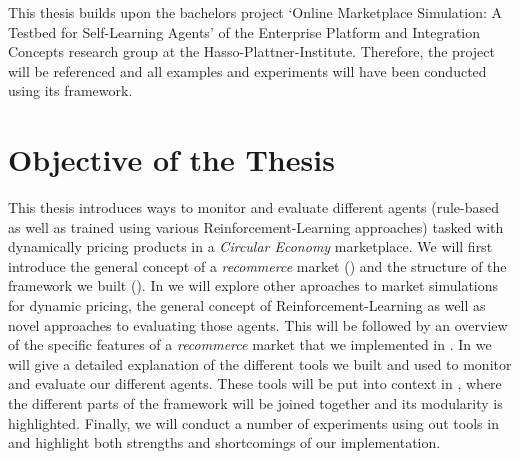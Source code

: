 \begin{jointwork}
	This thesis builds upon the bachelors project `Online Marketplace Simulation: A Testbed for Self-Learning Agents' of the Enterprise Platform and Integration Concepts research group at the Hasso-Plattner-Institute. Therefore, the project will be referenced and all examples and experiments will have been conducted using its framework.
\end{jointwork}

\section{Objective of the Thesis}

This thesis introduces ways to monitor and evaluate different agents (rule-based as well as trained using various Reinforcement-Learning approaches) tasked with dynamically pricing products in a \emph{Circular Economy} marketplace.
We will first introduce the general concept of a \emph{recommerce} market () and the structure of the framework we built (). In  we will explore other aproaches to market simulations for dynamic pricing, the general concept of Reinforcement-Learning as well as novel approaches to evaluating those agents. This will be followed by an overview of the specific features of a \emph{recommerce} market that we implemented in . In  we will give a detailed explanation of the different tools we built and used to monitor and evaluate our different agents. These tools will be put into context in , where the different parts of the framework will be joined together and its modularity is highlighted. Finally, we will conduct a number of experiments using out tools in  and highlight both strengths and shortcomings of our implementation. 

